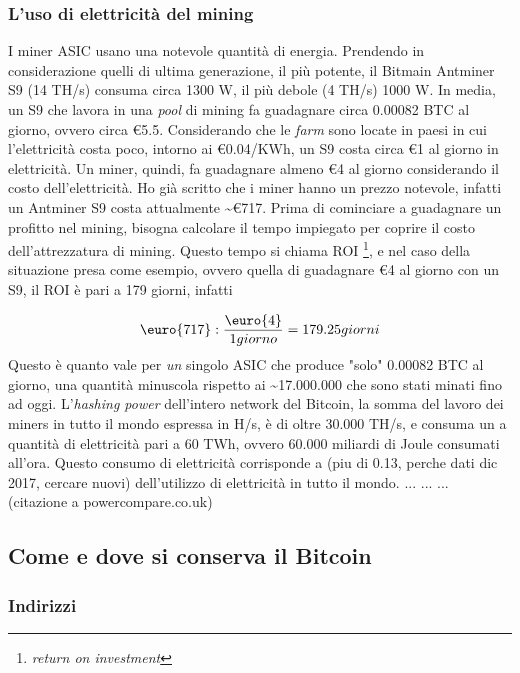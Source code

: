 \documentclass {article}
\begin{document}
\subsubsection {L'uso di elettricità del mining}


I miner ASIC usano una notevole quantità di energia. Prendendo in considerazione quelli di ultima generazione, il più potente, il Bitmain Antminer S9 (14 TH/s) consuma circa 1300 W, il più debole (4 TH/s) 1000 W.
In media, un S9 che lavora in una \textit{pool} di mining fa guadagnare circa 0.00082 BTC al giorno, ovvero circa \euro{5.5}.
Considerando che le \textit{farm} sono locate in paesi in cui l'elettricità costa poco, intorno ai \euro{0.04}/KWh, un S9 costa circa \euro{1} al giorno in elettricità.
Un miner, quindi, fa guadagnare almeno \euro{4} al giorno considerando il costo dell'elettricità.
Ho già scritto che i miner hanno un prezzo notevole, infatti un Antminer S9 costa attualmente \textasciitilde \euro{717}.
Prima di cominciare a guadagnare un profitto nel mining, bisogna calcolare il tempo impiegato per coprire il costo dell'attrezzatura di mining.
Questo tempo si chiama ROI \footnote{\textit{return on investment}}, e nel caso della situazione presa come esempio, ovvero quella di guadagnare \euro{4} al giorno con un S9, il ROI è pari a 179 giorni, infatti

$$\textup{\euro{717}} : \frac{\textup{\euro{4}}}{1 giorno} = 179.25 giorni$$
%
Questo è quanto vale per \emph{un} singolo ASIC che produce "solo" 0.00082 BTC al giorno, una quantità minuscola rispetto ai \textasciitilde 17.000.000 che sono stati minati fino ad oggi.
L'\textit{hashing power} dell'intero network del Bitcoin, la somma del lavoro dei miners in tutto il mondo espressa in H/s, è di oltre 30.000 TH/s, e consuma un a quantità di elettricità pari a 60 TWh, ovvero 60.000 miliardi di Joule consumati all'ora.
Questo consumo di elettricità corrisponde a (piu di 0.13, perche dati dic 2017, cercare nuovi) dell'utilizzo di elettricità in tutto il mondo.
... ... ... (citazione a powercompare.co.uk)


\subsection {Come e dove si conserva il Bitcoin}


\subsubsection {Indirizzi}
\end{document}
